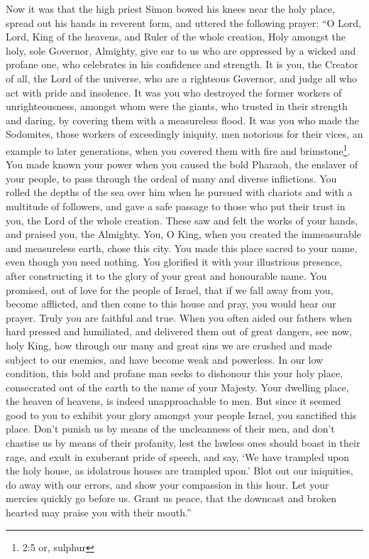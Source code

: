 Now it was that the high priest Simon bowed his knees near
the holy place, spread out his hands in reverent form, and uttered the
following prayer:  ``O Lord, Lord, King of the heavens, and
Ruler of the whole creation, Holy amongst the holy, sole Governor,
Almighty, give ear to us who are oppressed by a wicked and profane one,
who celebrates in his confidence and strength.  It is you,
the Creator of all, the Lord of the universe, who are a righteous
Governor, and judge all who act with pride and insolence. 
It was you who destroyed the former workers of unrighteousness, amongst
whom were the giants, who trusted in their strength and daring, by
covering them with a measureless flood.  It was you who made
the Sodomites, those workers of exceedingly iniquity, men notorious for
their vices, an example to later generations, when you covered them with
fire and brimstone\footnote{2:5 or, sulphur}.  You made
known your power when you caused the bold Pharaoh, the enslaver of your
people, to pass through the ordeal of many and diverse inflictions.
 You rolled the depths of the sea over him when he pursued
with chariots and with a multitude of followers, and gave a safe passage
to those who put their trust in you, the Lord of the whole creation.
 These saw and felt the works of your hands, and praised
you, the Almighty.  You, O King, when you created the
immeasurable and measureless earth, chose this city. You made this place
sacred to your name, even though you need nothing. You glorified it with
your illustrious presence, after constructing it to the glory of your
great and honourable name.  You promised, out of love for
the people of Israel, that if we fall away from you, become afflicted,
and then come to this house and pray, you would hear our prayer.
 Truly you are faithful and true.  When you
often aided our fathers when hard pressed and humiliated, and delivered
them out of great dangers,  see now, holy King, how through
our many and great sins we are crushed and made subject to our enemies,
and have become weak and powerless.  In our low condition,
this bold and profane man seeks to dishonour this your holy place,
consecrated out of the earth to the name of your Majesty. 
Your dwelling place, the heaven of heavens, is indeed unapproachable to
men.  But since it seemed good to you to exhibit your glory
amongst your people Israel, you sanctified this place. 
Don't punish us by means of the uncleanness of their men, and don't
chastise us by means of their profanity, lest the lawless ones should
boast in their rage, and exult in exuberant pride of speech, and say,
 `We have trampled upon the holy house, as idolatrous
houses are trampled upon.'  Blot out our iniquities, do
away with our errors, and show your compassion in this hour.
 Let your mercies quickly go before us. Grant us peace,
that the downcast and broken hearted may praise you with their mouth.''

